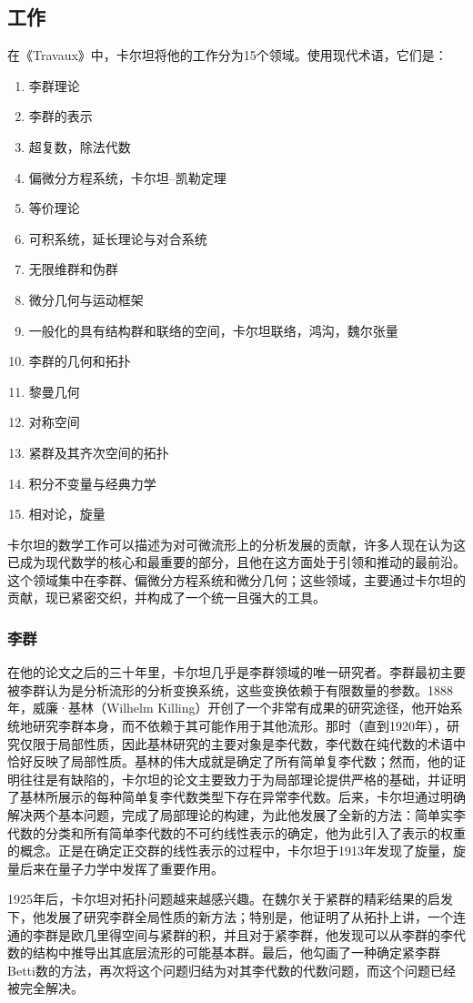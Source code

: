 \subsection{工作}  
在《Travaux》中，卡尔坦将他的工作分为15个领域。使用现代术语，它们是：
\begin{enumerate}
\item 李群理论  
\item 李群的表示  
\item 超复数，除法代数  
\item 偏微分方程系统，卡尔坦–凯勒定理  
\item 等价理论  
\item 可积系统，延长理论与对合系统  
\item 无限维群和伪群  
\item 微分几何与运动框架  
\item 一般化的具有结构群和联络的空间，卡尔坦联络，鸿沟，魏尔张量  
\item 李群的几何和拓扑  
\item 黎曼几何  
\item 对称空间  
\item 紧群及其齐次空间的拓扑  
\item 积分不变量与经典力学  
\item 相对论，旋量  
\end{enumerate}
卡尔坦的数学工作可以描述为对可微流形上的分析发展的贡献，许多人现在认为这已成为现代数学的核心和最重要的部分，且他在这方面处于引领和推动的最前沿。这个领域集中在李群、偏微分方程系统和微分几何；这些领域，主要通过卡尔坦的贡献，现已紧密交织，并构成了一个统一且强大的工具。
\subsubsection{李群}  
在他的论文之后的三十年里，卡尔坦几乎是李群领域的唯一研究者。李群最初主要被李群认为是分析流形的分析变换系统，这些变换依赖于有限数量的参数。1888年，威廉·基林（Wilhelm Killing）开创了一个非常有成果的研究途径，他开始系统地研究李群本身，而不依赖于其可能作用于其他流形。那时（直到1920年），研究仅限于局部性质，因此基林研究的主要对象是李代数，李代数在纯代数的术语中恰好反映了局部性质。基林的伟大成就是确定了所有简单复李代数；然而，他的证明往往是有缺陷的，卡尔坦的论文主要致力于为局部理论提供严格的基础，并证明了基林所展示的每种简单复李代数类型下存在异常李代数。后来，卡尔坦通过明确解决两个基本问题，完成了局部理论的构建，为此他发展了全新的方法：简单实李代数的分类和所有简单李代数的不可约线性表示的确定，他为此引入了表示的权重的概念。正是在确定正交群的线性表示的过程中，卡尔坦于1913年发现了旋量，旋量后来在量子力学中发挥了重要作用。

1925年后，卡尔坦对拓扑问题越来越感兴趣。在魏尔关于紧群的精彩结果的启发下，他发展了研究李群全局性质的新方法；特别是，他证明了从拓扑上讲，一个连通的李群是欧几里得空间与紧群的积，并且对于紧李群，他发现可以从李群的李代数的结构中推导出其底层流形的可能基本群。最后，他勾画了一种确定紧李群Betti数的方法，再次将这个问题归结为对其李代数的代数问题，而这个问题已经被完全解决。